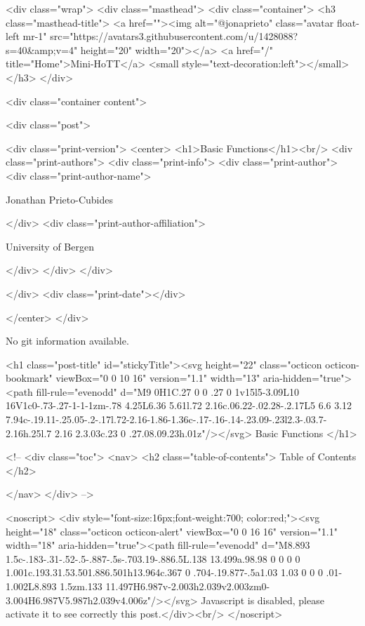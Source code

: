     <div class="wrap">
      <div class="masthead">
        <div class="container">
          <h3 class="masthead-title">
            <a href=""><img alt="@jonaprieto" class="avatar float-left mr-1" src="https://avatars3.githubusercontent.com/u/1428088?s=40&amp;v=4" height="20" width="20"></a>
            <a href="/" title="Home">Mini-HoTT</a>
            <small style="text-decoration:left"></small>
          </h3>
        </div>
      
      <div class="container content">
        







<div class="post">

  <div class="print-version">
    <center>
      <h1>Basic Functions</h1><br/>
        <div class="print-authors">
          <div class="print-info">
            <div class="print-author">
              <div class="print-author-name">
                
                  Jonathan Prieto-Cubides
                
              </div>
              <div class="print-author-affiliation">
                
                  University of Bergen
                
                </div>
            </div>
          </div>
          
          
        </div>
        <div class="print-date"></div>
        
        
    </center>
  </div>

  
  No git information available.
  
  <h1 class="post-title" id="stickyTitle"><svg height="22" class="octicon octicon-bookmark" viewBox="0 0 10 16" version="1.1" width="13" aria-hidden="true"><path fill-rule="evenodd" d="M9 0H1C.27 0 0 .27 0 1v15l5-3.09L10 16V1c0-.73-.27-1-1-1zm-.78 4.25L6.36 5.61l.72 2.16c.06.22-.02.28-.2.17L5 6.6 3.12 7.94c-.19.11-.25.05-.2-.17l.72-2.16-1.86-1.36c-.17-.16-.14-.23.09-.23l2.3-.03.7-2.16h.25l.7 2.16 2.3.03c.23 0 .27.08.09.23h.01z"/></svg> Basic Functions
  </h1>

  <!-- 
  <div class="toc">
    <nav>
    <h2 class="table-of-contents"> Table of Contents </h2>
      

    </nav>
  </div>
   -->

  <noscript>
  <div style="font-size:16px;font-weight:700; color:red;"><svg height="18" class="octicon octicon-alert" viewBox="0 0 16 16" version="1.1" width="18" aria-hidden="true"><path fill-rule="evenodd" d="M8.893 1.5c-.183-.31-.52-.5-.887-.5s-.703.19-.886.5L.138 13.499a.98.98 0 0 0 0 1.001c.193.31.53.501.886.501h13.964c.367 0 .704-.19.877-.5a1.03 1.03 0 0 0 .01-1.002L8.893 1.5zm.133 11.497H6.987v-2.003h2.039v2.003zm0-3.004H6.987V5.987h2.039v4.006z"/></svg> Javascript is disabled, please activate it to see correctly this post.</div><br/>
  </noscript>

